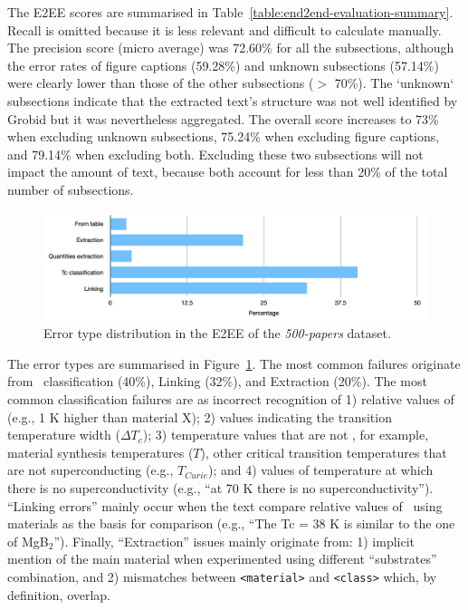 The E2EE scores are summarised in Table~\ref{table:end2end-evaluation-summary}.
Recall is omitted because it is less relevant and difficult to calculate manually.
The precision score (micro average) was 72.60\% for all the subsections, although the error rates of figure captions (59.28\%) and unknown subsections (57.14\%) were clearly lower than those of the other subsections ($>$ 70\%).
The `unknown` subsections indicate that the extracted text's structure was not well identified by Grobid but it was nevertheless aggregated.
The overall score increases to 73\% when excluding unknown subsections, 75.24\% when excluding figure captions, and 79.14\%  when excluding both.
Excluding these two subsections will not impact the amount of text, because both account for less than 20\% of the total number of subsections.

\begin{figure}[ht]
    \centering
    \includegraphics[width=\linewidth]{figures/automatic_extraction_supercon/error-types-bars-perc}
    \caption{Error type distribution in the E2EE of the \textit{500-papers} dataset.}
    \label{fig:error-types-distribution}
\end{figure}

The error types are summarised in Figure~\ref{fig:error-types-distribution}. The most common failures originate from \tc~classification (40\%), Linking (32\%), and Extraction (20\%).
The most common \tc classification failures are as incorrect recognition of 1) relative values of \tc (e.g., 1 K higher than material X); 2) values indicating the transition temperature width ($\Delta T_{c}$); 3) temperature values that are not \tc, for example, material synthesis temperatures ($T$), other critical transition temperatures that are not superconducting (e.g., $T_{Curie}$); and 4) values of temperature at which there is no superconductivity (e.g., ``at 70 K there is no superconductivity'').
``Linking errors'' mainly occur when the text compare relative values of \tc~using materials as the basis for comparison (e.g., ``The Tc = 38 K is similar to the one of MgB$_{2}$'').
Finally, ``Extraction'' issues mainly originate from: 1) implicit mention of the main material when experimented using different ``substrates'' combination, and 2) mismatches between \texttt{<material>} and \texttt{<class>} which, by definition, overlap.


